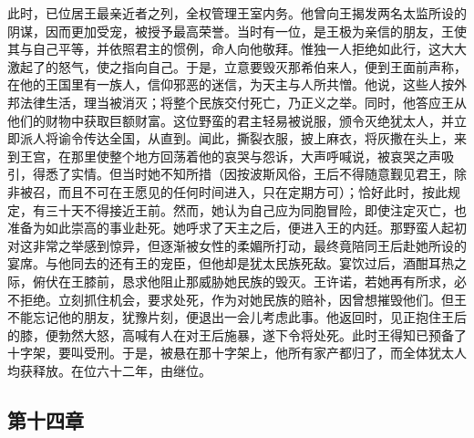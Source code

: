 此时，已位居王最亲近者之列，全权管理王室内务。他曾向王揭发两名太监所设的阴谋，因而更加受宠，被授予最高荣誉。当时有一位，是王极为亲信的朋友，王使其与自己平等，并依照君主的惯例，命人向他敬拜。惟独一人拒绝如此行，这大大激起了的怒气，使之指向自己。于是，立意要毁灭那希伯来人，便到王面前声称，在他的王国里有一族人，信仰邪恶的迷信，为天主与人所共憎。他说，这些人按外邦法律生活，理当被消灭；将整个民族交付死亡，乃正义之举。同时，他答应王从他们的财物中获取巨额财富。这位野蛮的君主轻易被说服，颁令灭绝犹太人，并立即派人将谕令传达全国，从直到。闻此，撕裂衣服，披上麻衣，将灰撒在头上，来到王宫，在那里使整个地方回荡着他的哀哭与怨诉，大声呼喊说，被哀哭之声吸引，得悉了实情。但当时她不知所措（因按波斯风俗，王后不得随意觐见君王，除非被召，而且不可在王愿见的任何时间进入，只在定期方可）；恰好此时，按此规定，有三十天不得接近王前。然而，她认为自己应为同胞冒险，即使注定灭亡，也准备为如此崇高的事业赴死。她呼求了天主之后，便进入王的内廷。那野蛮人起初对这非常之举感到惊异，但逐渐被女性的柔媚所打动，最终竟陪同王后赴她所设的宴席。与他同去的还有王的宠臣，但他却是犹太民族死敌。宴饮过后，酒酣耳热之际，俯伏在王膝前，恳求他阻止那威胁她民族的毁灭。王许诺，若她再有所求，必不拒绝。立刻抓住机会，要求处死，作为对她民族的赔补，因曾想摧毁他们。但王不能忘记他的朋友，犹豫片刻，便退出一会儿考虑此事。他返回时，见正抱住王后的膝，便勃然大怒，高喊有人在对王后施暴，遂下令将处死。此时王得知已预备了十字架，要叫受刑。于是，被悬在那十字架上，他所有家产都归了，而全体犹太人均获释放。在位六十二年，由继位。\par


\subsection{第十四章}

